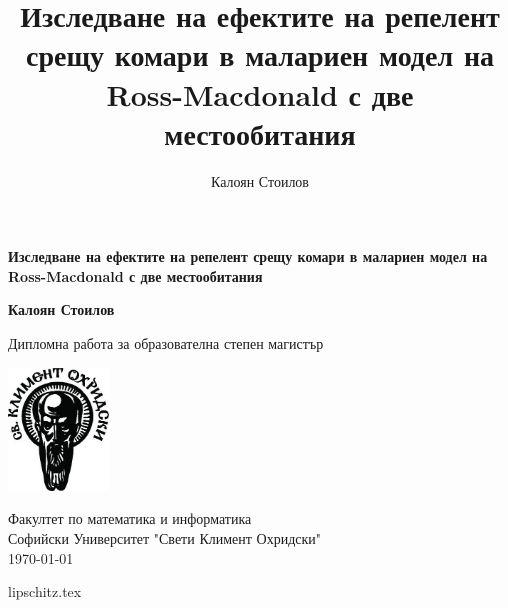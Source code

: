 \documentclass[bulgarian, 12pt]{article}
\title{Изследване на ефектите на репелент срещу комари в малариен модел на Ross-Macdonald с две местообитания}
\author{Калоян Стоилов}
\begin{document}
\begin{titlepage}
  \begin{center}
    \vspace*{1cm}

    \Huge
    \textbf{Изследване на ефектите на репелент срещу комари в малариен модел на Ross-Macdonald с две местообитания}


    \vspace{1.5cm}

    \textbf{Калоян Стоилов}

    \vfill

    Дипломна работа за образователна степен магистър

    \vspace{0.8cm}

    \includegraphics[width=0.2\textwidth]{logo_su_s_nadpis_imagelarge.jpg}

    \Large
    Факултет по математика и информатика\\
    Софийски Университет "Свети Климент Охридски"\\
    \today

  \end{center}
\end{titlepage}
\tableofcontents
\thispagestyle{empty}
\newpage
\setcounter{page}{1}
{lipschitz.tex}
\cite{Rashkov2019}
\cite{Capasso2008}
\cite{Osher2003}
\printbibliography
\end{document}
